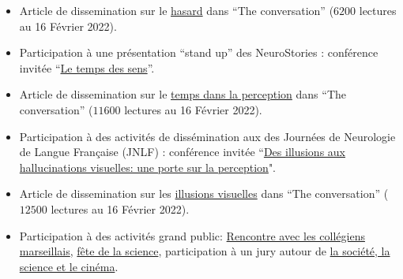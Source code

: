 \documentclass[10pt,french,a4paper,oneside]{article}%
\newcommand{\years}[1]{\marginpar{\textit{\scriptsize #1}}}
\begin{document}
\begin{itemize}

	\item Article de dissemination sur le \href{https://laurentperrinet.github.io/publication/perrinet-21-hasard/}{hasard} dans ``The conversation'' ($6200$ lectures au 16 Février 2022).

	\item Participation à une présentation ``stand up'' des NeuroStories : conférence invitée  ``\href{https://laurentperrinet.github.io/post/2019-10-07_neurostories/}{Le temps des sens}''.

	\item Article de dissemination sur le \href{https://laurentperrinet.github.io/publication/perrinet-19-temps/}{temps dans la perception} dans ``The conversation'' ($11600$ lectures au 16 Février 2022).

	\item Participation à des activités de dissémination aux des Journées de Neurologie de Langue Française (JNLF) : conférence invitée  ``\href{https://laurentperrinet.github.io/talk/2019-04-18-jnlf/}{Des illusions aux hallucinations visuelles: une porte sur la perception}".

	\item Article de dissemination sur les \href{https://theconversation.com/illusions-et-hallucinations-visuelles-une-porte-sur-la-perception-117389}{illusions visuelles} dans ``The conversation'' ($12500$ lectures au 16 Février 2022).

	\item Participation à des activités grand public: \href{https://laurentperrinet.github.io/talk/2019-01-10-polly-maggoo/}{Rencontre avec les collégiens marseillais}, \href{https://laurentperrinet.github.io/talk/2018-10-10-polly-maggoo/}{fête de la science}, participation à un jury autour de \href{https://laurentperrinet.github.io/talk/2017-11-17-festival-interferences/}{la société, la science et le cinéma}.


%
%
%

\end{itemize}
\end{document}
